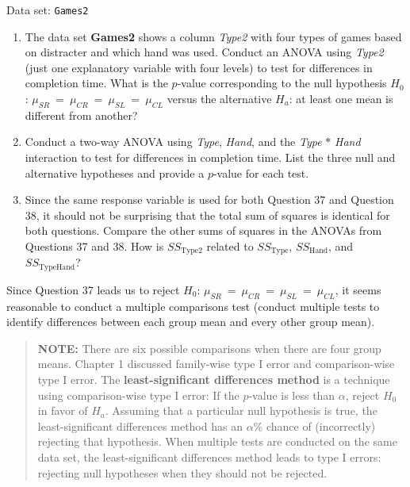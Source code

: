 \documentclass[
]{report}
\begin{document}
Data set: \texttt{Games2}

\begin{enumerate}
\def\labelenumi{\arabic{enumi}.}
\setcounter{enumi}{36}
\item
  The data set \textbf{Games2} shows a column \emph{Type2} with four types of games based on distracter and which hand was used. Conduct an ANOVA using \emph{Type2} (just one explanatory variable with four levels) to test for differences in completion time. What is the \(\scriptstyle p\)-value corresponding to the null hypothesis \(\scriptstyle H_0\): \(\scriptstyle \mu_{SR} \ =\  \mu_{CR} \ =\  \mu_{SL} \ =\  \mu_{CL}\) versus the alternative \(\scriptstyle H_a\): at least one mean is different from another?
\item
  Conduct a two-way ANOVA using \emph{Type}, \emph{Hand}, and the \emph{Type} \(\ast\) \emph{Hand} interaction to test for differences in completion time. List the three null and alternative hypotheses and provide a \(\scriptstyle p\)-value for each test.
\item
  Since the same response variable is used for both Question 37 and Question 38, it should not be surprising that the total sum of squares is identical for both questions. Compare the other sums of squares in the ANOVAs from Questions 37 and 38. How is \(\scriptstyle SS_{\text{Type2}}\) related to \(\scriptstyle SS_{\text{Type}}\), \(\scriptstyle SS_{\text{Hand}}\), and \(\scriptstyle SS_{\text{TypeHand}}\)?
\end{enumerate}

Since Question 37 leads us to reject \(\scriptstyle H_0\): \(\scriptstyle \mu_{SR} \ =\  \mu_{CR} \ =\  \mu_{SL} \ =\  \mu_{CL}\), it seems reasonable to conduct a multiple comparisons test (conduct multiple tests to identify differences between each group mean and every other group mean).

\begin{quote}
\textbf{NOTE:} There are six possible comparisons when there are four group means. Chapter 1 discussed family-wise type I error and comparison-wise type I error. The \textbf{least-significant differences method} is a technique using comparison-wise type I error: If the \(\scriptstyle p\)-value is less than \(\scriptstyle \alpha\), reject \(\scriptstyle H_0\) in favor of \(\scriptstyle H_a\). Assuming that a particular null hypothesis is true, the least-significant differences method has an \(\scriptstyle \alpha\)\% chance of (incorrectly) rejecting that hypothesis. When multiple tests are conducted on the same data set, the least-significant differences method leads to type I errors: rejecting null hypotheses when they should not be rejected.
\end{quote}
\end{document}
